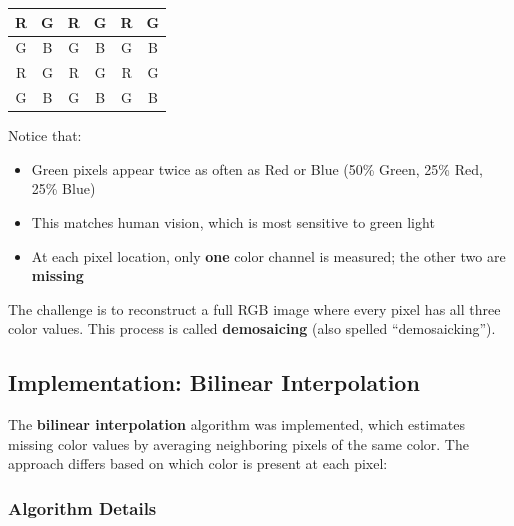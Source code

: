 \documentclass[12pt]{article}
\begin{document}
\begin{center}
\begin{tabular}{|c|c|c|c|c|c|}
\hline
R & G & R & G & R & G \\
\hline
G & B & G & B & G & B \\
\hline
R & G & R & G & R & G \\
\hline
G & B & G & B & G & B \\
\hline
\end{tabular}
\end{center}

Notice that:
\begin{itemize}
    \item Green pixels appear twice as often as Red or Blue (50\% Green, 25\% Red, 25\% Blue)
    \item This matches human vision, which is most sensitive to green light
    \item At each pixel location, only \textbf{one} color channel is measured; the other two are \textbf{missing}
\end{itemize}

The challenge is to reconstruct a full RGB image where every pixel has all three color values. This process is called \textbf{demosaicing} (also spelled ``demosaicking'').

\subsection*{Implementation: Bilinear Interpolation}

The \textbf{bilinear interpolation} algorithm was implemented, which estimates missing color values by averaging neighboring pixels of the same color. The approach differs based on which color is present at each pixel:

\subsubsection*{Algorithm Details}
\end{document}
